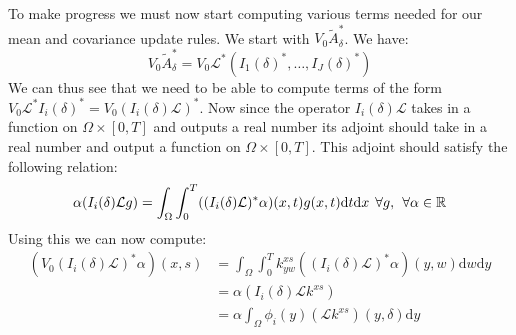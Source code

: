 \documentclass{article}
\theoremstyle{definition}
\theoremstyle{remark}
\theoremstyle{remark}
\begin{document}
\noindent To make progress we must now start computing various terms needed for our mean and covariance update rules. We start with $V_{0}\tilde{A}_{\delta}^{*}$. We have:
\begin{equation*}
    V_{0}\tilde{A}_{\delta}^{*}=V_{0}\mathcal{L}^{*}(I_{1}(\delta)^{*},\dots,I_{J}(\delta)^{*})
\end{equation*}
We can thus see that we need to be able to compute terms of the form $V_{0}\mathcal{L}^{*}I_{i}(\delta)^{*}=V_{0}(I_{i}(\delta)\mathcal{L})^{*}$. Now since the operator $I_{i}(\delta)\mathcal{L}$ takes in a function on $\Omega\times[0,T]$ and outputs a real number its adjoint should take in a real number and output a function on $\Omega\times[0,T]$. This adjoint should satisfy the following relation:
\begin{equation}
    \alpha(I_{i}(\delta)\mathcal{L}g)=\int_{\Omega}\int_{0}^{T}((I_{i}(\delta)\mathcal{L})^{*}\alpha)(x,t)g(x,t)\mathrm{d}t\mathrm{d}x \hspace{0.15cm} \forall{g}, \hspace{0.15cm} \forall\alpha\in\mathbb{R}
\end{equation}
Using this we can now compute:
\begin{align*}
    (V_{0}(I_{i}(\delta)\mathcal{L})^{*}\alpha)(x,s) &= \int_{\Omega}\int_{0}^{T}k_{yw}^{xs}((I_{i}(\delta)\mathcal{L})^{*}\alpha)(y,w)\mathrm{d}w\mathrm{d}y \\
    &=\alpha (I_{i}(\delta)\mathcal{L}k^{xs}) \\
    &=\alpha\int_{\Omega}\phi_{i}(y)(\mathcal{L}k^{xs})(y,\delta)\mathrm{d}y
\end{align*}
\end{document}
